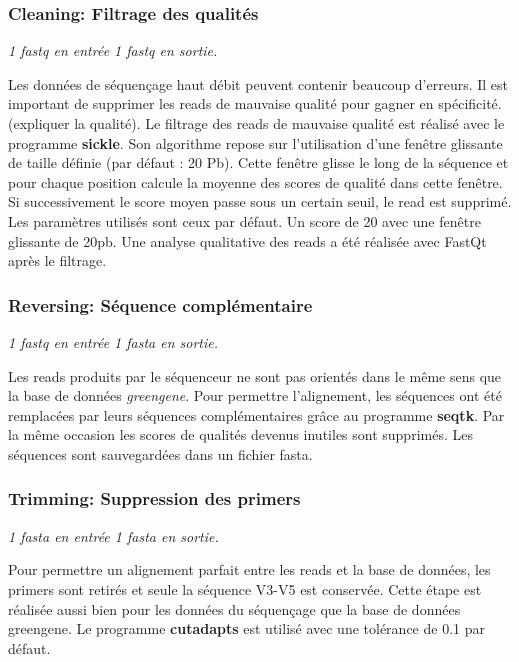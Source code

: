\documentclass[12pt,a4paper]{article}
\begin{document}
\subsubsection{Cleaning: Filtrage des qualités}\begin{center}\emph{1 fastq en entrée 1 fastq en sortie. } \end{center}

Les données de séquençage haut débit peuvent contenir beaucoup d'erreurs. Il est important de supprimer les reads de mauvaise qualité pour gagner en spécificité. (expliquer la qualité).
Le filtrage des reads de mauvaise qualité est réalisé avec le programme \textbf{sickle}. Son algorithme repose sur l'utilisation d'une fenêtre glissante de taille définie (par défaut : 20 Pb). Cette fenêtre glisse le long de la séquence et pour chaque position calcule la moyenne des scores de qualité dans cette fenêtre. Si successivement le score moyen passe sous un certain seuil, le read est supprimé. Les paramètres utilisés sont ceux par défaut. Un score de 20 avec une fenêtre glissante de 20pb. 
Une analyse qualitative des reads a été réalisée avec FastQt\citep{Beck} après le filtrage. 


\subsubsection{Reversing: Séquence complémentaire}\begin{center}\emph{1 fastq en entrée 1 fasta en sortie. } \end{center}

Les reads produits par le séquenceur ne sont pas orientés dans le même sens que la base de données \textit{greengene}. Pour permettre l'alignement, les séquences ont été remplacées par leurs séquences complémentaires grâce au programme \textbf{seqtk}. 
Par la même occasion les scores de qualités devenus inutiles sont supprimés. Les séquences sont sauvegardées dans un fichier fasta. 

\subsubsection{Trimming: Suppression des primers} \begin{center}\emph{1 fasta en entrée 1 fasta en sortie. } \end{center}

Pour permettre un alignement parfait entre les reads et la base de données, les primers sont retirés et seule la séquence V3-V5 est conservée. Cette étape est réalisée aussi bien pour les données du séquençage que  la base de données greengene.  
Le programme \textbf{cutadapts} est utilisé avec une tolérance de 0.1 par défaut. 
\end{document}
